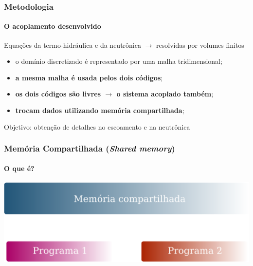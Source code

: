 \documentclass[svgnames,smaller,table]{beamer}
\begin{document}
\begin{frame}
  \frametitle{Metodologia}
  \framesubtitle{O acoplamento desenvolvido}
  Equações da termo-hidráulica e da neutrônica $\rightarrow$ resolvidas por volumes finitos
  \begin{itemize}
  \item o domínio discretizado é representado por uma malha tridimensional;
  \item \textbf{a mesma malha é usada pelos dois códigos};
  \item \textbf{os dois códigos são livres $\rightarrow$ o sistema acoplado também};
  \item \textbf{trocam dados utilizando memória compartilhada};
  \end{itemize}
  \centering
  \vspace{0.5cm}
  \Large{Objetivo: obtenção de detalhes no escoamento e na neutrônica}
  
\end{frame}

{
\begin{frame}
  \frametitle{Memória Compartilhada (\textit{Shared memory})}
  \framesubtitle{O que é?}
  \centering\includegraphics[scale=0.9]{../figuras/shm-neg.png}
\end{frame}
}
\end{document}
